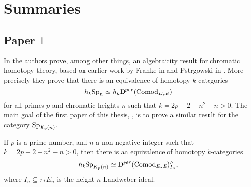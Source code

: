 

\section{Summaries}

\subsection{Paper 1}

In \cite{patchkoria-pstragowski_2021} the authors prove, among other things, an algebraicity result for chromatic homotopy theory, based on earlier work by Franke in \cite{franke_96} and Pstr\a{}gowski in \cite{pstragowski_2021}. More precisely they prove that there is an equivalence of homotopy $k$-categories 
\[h_k \mathrm{Sp}_{n} \simeq h_k \mathrm{D}^{per}(\mathrm{Comod}_{E_*E})\]
for all primes $p$ and chromatic heights $n$ such that $k = 2p-2-n^2-n > 0$. The main goal of the first paper of this thesis, \cite{aambo_2024_algebraicity}, is to prove a similar result for the category $\mathrm{Sp}_{K_p(n)}$. 

\begin{theorem}
    If $p$ is a prime number, and $n$ a non-negative integer such that $k = 2p-2-n^2-n > 0$, then there is an equivalence of homotopy $k$-categories 
    \[h_k \mathrm{Sp}_{K_p(n)} \simeq \mathrm{D}^{per}(\mathrm{Comod}_{E_*E})^\wedge_{I_n},\]
    where $I_n \subseteq \pi_* E_n$ is the height $n$ Landweber ideal. 
\end{theorem}
